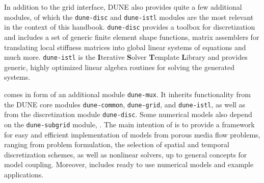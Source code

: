 In addition to the grid interface, DUNE also provides quite a few additional
modules, of which the \texttt{dune-disc} and \texttt{dune-istl} modules are the most
relevant in the context of this handbook.  \texttt{dune-disc} provides a toolbox for
discretization and includes a set of generic finite element shape
functions, matrix assemblers for translating local stiffness matrices
into global linear systems of equations and much more. \texttt{dune-istl} is the
\textbf{I}terative \textbf{S}olver \textbf{T}emplate \textbf{L}ibrary
and provides generic, highly optimized linear algebra routines for solving
the generated systems. 

\Dumux comes in form of an additional module \texttt{dune-mux}. 
It inherits functionality from the DUNE core modules 
\texttt{dune-common}, \texttt{dune-grid}, and \texttt{dune-istl}, as well as from 
the discretization module \texttt{dune-disc}. Some numerical models 
also depend on the \texttt{dune-subgrid} module, \cite{subgrid}. 
The main intention of \Dumux is to provide a framework for easy and efficient 
implementation of models from porous media flow problems, 
ranging from problem formulation, the selection of 
spatial and temporal discretization schemes, as well as nonlinear solvers,  
up to general concepts for model coupling.  
Moreover, \Dumux includes ready to use numerical models and example applications. 

